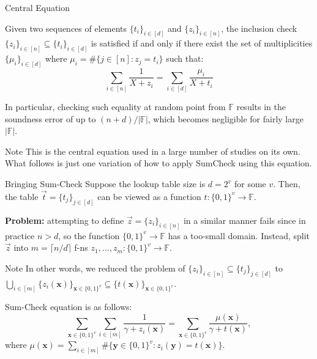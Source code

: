 \documentclass{zkdl-presentation-template}
\begin{document}
    \begin{frame}{Central Equation}
        \begin{theorem}
            Given two sequences of elements $\{t_i\}_{i \in [d]}$ and $\{z_i\}_{i \in
            [n]}$, the inclusion check $\{z_i\}_{i \in [n]} \subseteq \{t_i\}_{i \in
            [d]}$ is satisfied if and only if there exist the set of multiplicities
            $\{\mu_i\}_{i \in [d]}$ where $\mu_i = \#\{j \in [n]: z_j = t_i\}$ such that:
            \begin{equation*}
                \sum_{i \in [n]} \frac{1}{X+z_i} = \sum_{i \in [d]} \frac{\mu_i}{X+t_i}
            \end{equation*}
        \end{theorem}

        \pause In particular, checking such equality at random point from $\mathbb{F}$
        results in the soundness error of up to $(n+d)/|\mathbb{F}|$, which becomes
        negligible for fairly large $|\mathbb{F}|$.\pause

        \begin{alertblock}{Note}
            This is the central equation used in a large number of studies on its own. What follows 
            is just one variation of how to apply SumCheck using this equation.
        \end{alertblock}
    \end{frame}

    \begin{frame}{Bringing Sum-Check}
        Suppose the lookup table size is $d=2^v$ for some $v$. Then, the table
        $\vec{t} = \{t_j\}_{j \in [d]}$ can be viewed as a function $t:
        \{0,1\}^v \to \mathbb{F}$.\pause

        \textcolor{red!70!black}{\textbf{Problem:}} attempting to define $\vec{z} = \{z_i\}_{i \in [n]}$
        in a similar manner fails since in practice $n>d$, so the function
        $\{0,1\}^v \to \mathbb{F}$ has a too-small domain. Instead, split $\vec{z}$ into 
        $m=\lceil n/d \rceil$ f-ns $z_1,\dots,z_m: \{0,1\}^v \to \mathbb{F}$.\pause

        \begin{block}{Note}
            In other words, we reduced the problem of $\{z_i\}_{i \in [n]}
            \subseteq \{t_j\}_{j \in [d]}$ to $\bigcup_{i \in
            [m]}\{z_i(\mathbf{x})\}_{\mathbf{x} \in \{0,1\}^v} \subseteq
            \{t(\mathbf{x})\}_{\mathbf{x} \in \{0,1\}^v}$.\pause
        \end{block}

        Sum-Check equation is as follows:
        \begin{equation*}
            \boxed{\sum_{\mathbf{x} \in \{0,1\}^v} \sum_{i \in [m]} \frac{1}{\gamma + z_i(\mathbf{x})} = \sum_{\mathbf{x} \in \{0,1\}^v} \frac{\mu(\mathbf{x})}{\gamma+t(\mathbf{x})}},
        \end{equation*}
        where $\mu(\mathbf{x}) = \sum_{i \in [m]}\#\{\mathbf{y} \in \{0,1\}^v:
        z_i(\mathbf{y})=t(\mathbf{x})\}$.
    \end{frame}
\end{document}
